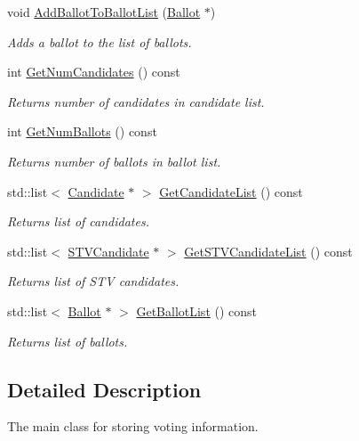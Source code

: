 \begin{DoxyCompactItemize}
void \hyperlink{classVotingInfo_ae4b8b9a77642271760bce59a0411f900}{Add\+Ballot\+To\+Ballot\+List} (\hyperlink{classBallot}{Ballot} $\ast$)
\begin{DoxyCompactList}\small\item\em Adds a ballot to the list of ballots. \end{DoxyCompactList}\item 
int \hyperlink{classVotingInfo_add7749e53650135da703aa7b816598f5}{Get\+Num\+Candidates} () const
\begin{DoxyCompactList}\small\item\em Returns number of candidates in candidate list. \end{DoxyCompactList}\item 
int \hyperlink{classVotingInfo_af84ccfdfbdf95bc33f959d8b82e27d8c}{Get\+Num\+Ballots} () const
\begin{DoxyCompactList}\small\item\em Returns number of ballots in ballot list. \end{DoxyCompactList}\item 
std\+::list$<$ \hyperlink{classCandidate}{Candidate} $\ast$ $>$ \hyperlink{classVotingInfo_ad64e934ebd73e4be9e89458e0a304030}{Get\+Candidate\+List} () const
\begin{DoxyCompactList}\small\item\em Returns list of candidates. \end{DoxyCompactList}\item 
std\+::list$<$ \hyperlink{classSTVCandidate}{S\+T\+V\+Candidate} $\ast$ $>$ \hyperlink{classVotingInfo_a16f743613daad52be36a92226001e5dd}{Get\+S\+T\+V\+Candidate\+List} () const
\begin{DoxyCompactList}\small\item\em Returns list of S\+TV candidates. \end{DoxyCompactList}\item 
std\+::list$<$ \hyperlink{classBallot}{Ballot} $\ast$ $>$ \hyperlink{classVotingInfo_a73ac1888c3695a912ef6991b6667eeaf}{Get\+Ballot\+List} () const
\begin{DoxyCompactList}\small\item\em Returns list of ballots. \end{DoxyCompactList}\end{DoxyCompactItemize}


\subsection{Detailed Description}
The main class for storing voting information. 

